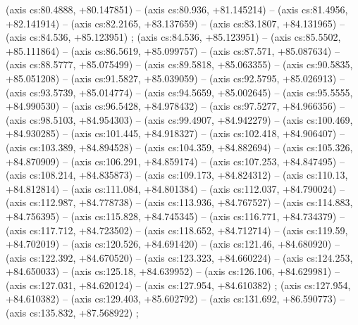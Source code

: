     (axis cs:80.4888,    +80.147851) --  (axis cs:80.936,    +81.145214) --  (axis cs:81.4956,    +82.141914) --  (axis cs:82.2165,    +83.137659) --  (axis cs:83.1807,    +84.131965) --  (axis cs:84.536,    +85.123951) ;
    (axis cs:84.536,    +85.123951) --  (axis cs:85.5502,    +85.111864) --  (axis cs:86.5619,    +85.099757) --  (axis cs:87.571,    +85.087634) --  (axis cs:88.5777,    +85.075499) --  (axis cs:89.5818,    +85.063355) --  (axis cs:90.5835,    +85.051208) --  (axis cs:91.5827,    +85.039059) --  (axis cs:92.5795,    +85.026913) --  (axis cs:93.5739,    +85.014774) --  (axis cs:94.5659,    +85.002645) --  (axis cs:95.5555,    +84.990530) --  (axis cs:96.5428,    +84.978432) --  (axis cs:97.5277,    +84.966356) --  (axis cs:98.5103,    +84.954303) --  (axis cs:99.4907,    +84.942279) --  (axis cs:100.469,    +84.930285) --  (axis cs:101.445,    +84.918327) --  (axis cs:102.418,    +84.906407) --  (axis cs:103.389,    +84.894528) --  (axis cs:104.359,    +84.882694) --  (axis cs:105.326,    +84.870909) --  (axis cs:106.291,    +84.859174) --  (axis cs:107.253,    +84.847495) --  (axis cs:108.214,    +84.835873) --  (axis cs:109.173,    +84.824312) --  (axis cs:110.13,    +84.812814) --  (axis cs:111.084,    +84.801384) --  (axis cs:112.037,    +84.790024) --  (axis cs:112.987,    +84.778738) --  (axis cs:113.936,    +84.767527) --  (axis cs:114.883,    +84.756395) --  (axis cs:115.828,    +84.745345) --  (axis cs:116.771,    +84.734379) --  (axis cs:117.712,    +84.723502) --  (axis cs:118.652,    +84.712714) --  (axis cs:119.59,    +84.702019) --  (axis cs:120.526,    +84.691420) --  (axis cs:121.46,    +84.680920) --  (axis cs:122.392,    +84.670520) --  (axis cs:123.323,    +84.660224) --  (axis cs:124.253,    +84.650033) --  (axis cs:125.18,    +84.639952) --  (axis cs:126.106,    +84.629981) --  (axis cs:127.031,    +84.620124) --  (axis cs:127.954,    +84.610382) ;
    (axis cs:127.954,    +84.610382) --  (axis cs:129.403,    +85.602792) --  (axis cs:131.692,    +86.590773) --  (axis cs:135.832,    +87.568922) ;
